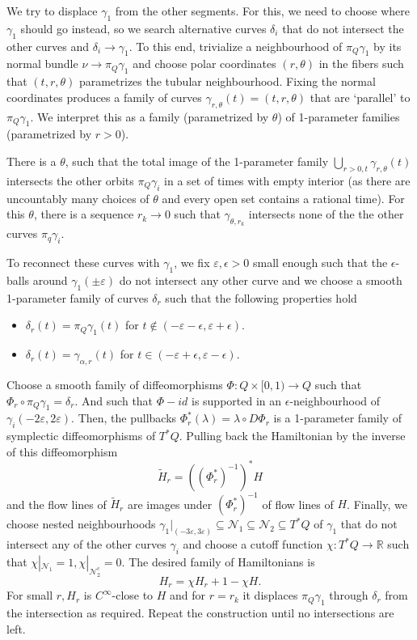 \documentclass{amsart}
\newcommand{\Ncal}{{\mathcal{N}}}
\newcommand{\RR}{\mathbb{R}}
\theoremstyle{definition}
\theoremstyle{remark}
\numberwithin{equation}{section}
\begin{document}
We try to displace $\gamma_1$ from the other segments. For this, we need to choose where $\gamma_1$ should go instead, so we search alternative curves $\delta_i$ that do not intersect the other curves and $\delta_i\to\gamma_1$. To this end, trivialize a neighbourhood of $\pi_Q\gamma_1$ by its normal bundle $\nu\to\pi_Q\gamma_1$ and choose polar coordinates $(r,\theta)$ in the fibers such that $(t,r,\theta)$ parametrizes the tubular neighbourhood. Fixing the normal coordinates produces a family of curves $\gamma_{r,\theta}(t)=(t,r,\theta)$ that are `parallel' to $\pi_Q\gamma_1$. We interpret this as a family (parametrized by $\theta$) of 1-parameter families (parametrized by $r>0$). 

There is a $\theta$, such that the total image of the 1-parameter family $\bigcup_{r>0,t}\gamma_{r,\theta}(t)$ intersects the other orbits $\pi_Q\gamma_i$ in a set of times with empty interior (as there are uncountably many choices of $\theta$ and every open set contains a rational time). For this $\theta$, there is a sequence $r_k\to 0$ such that $\gamma_{\theta,r_k}$ intersects none of the the other curves $\pi_q\gamma_i$. 

To reconnect these curves with $\gamma_1$, we fix $\varepsilon,\epsilon>0$ small enough such that the $\epsilon$-balls around $\gamma_1(\pm\varepsilon)$ do not intersect any other curve and we choose a smooth 1-parameter family of curves $\delta_r$ such that the following properties hold
\begin{itemize}
    \item $\delta_r(t)=\pi_Q\gamma_1(t)$ for $t\notin (-\varepsilon-\epsilon,\varepsilon+\epsilon)$.
    \item $\delta_r(t)=\gamma_{\alpha,r}(t)$ for $t\in (-\varepsilon+\epsilon,\varepsilon-\epsilon)$.
\end{itemize}

Choose a smooth family of diffeomorphisms $\Phi:Q\times[0,1)\to Q$ such that $\Phi_r\circ \pi_Q \gamma_1=\delta_r$. And such that $\Phi-id$ is supported in an $\epsilon$-neighbourhood of $\gamma_i(-2\varepsilon,2\varepsilon)$. Then, the pullbacks $\Phi^*_r(\lambda)=\lambda\circ D\Phi_r$ is a 1-parameter family of symplectic diffeomorphisms of $T^*Q$. Pulling back the Hamiltonian by the inverse of this diffeomorphism
$$\tilde H_r = ((\Phi^*_r)^{-1})^*H$$
and the flow lines of $\tilde H_r$ are images under $(\Phi^*_r)^{-1}$ of flow lines of $H$. Finally, we choose nested neighbourhoods $\gamma_1|_{(-3\varepsilon,3\varepsilon)}\subseteq\Ncal_1\subseteq\Ncal_2\subseteq T^*Q$ of $\gamma_1$ that do not intersect any of the other curves $\gamma_i$ and choose a cutoff function $\chi:T^*Q\to \RR$ such that $\chi|_{\Ncal_1}=1,\chi|_{\Ncal_2^c}=0$. The desired family of Hamiltonians is 
$$H_r= \chi H_r +{1-\chi}H.$$
For small $r, H_r$ is $C^\infty$-close to $H$ and for $r=r_k$ it displaces $\pi_Q\gamma_1$ through $\delta_r$ from the intersection as required. Repeat the construction until no intersections are left. 
\end{document}
